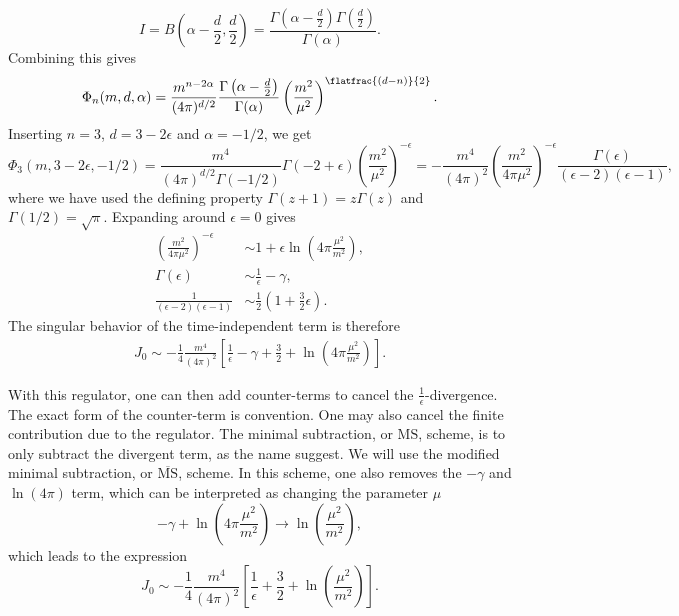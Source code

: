 \documentclass{article}
\begin{document}
\begin{equation}
    I = B\left(\alpha - \frac{d}{2}, \frac{d}{2}\right) 
    = \frac{\Gamma\left(\alpha - \frac{d}{2}\right) \Gamma\left(\frac{d}{2}\right)}{\Gamma(\alpha)}.
\end{equation}
Combining this gives
\begin{equation}
    \label{result dimreg}
    \Phi_n(m, d, \alpha) = \frac{m^{n - 2\alpha}}{(4 \pi)^{d / 2}}
    \frac{
        \Gamma \left(\alpha - \frac{d}{2} \right) 
    }
    {\Gamma(\alpha)}
    \left(\frac{m^2}{\mu^2}\right)^{\flatfrac{(d-n)}{2}} 
    .
\end{equation}
Inserting $n=3$, $d = 3 - 2\epsilon$ and $\alpha = -1/2$, we get
\begin{equation}
    \Phi_3(m, 3 - 2\epsilon, -1/2)
    =
    \frac{m^4}{(4 \pi)^{d/2}\Gamma(-1/2)} \Gamma(-2 + \epsilon) \left(\frac{m^2}{\mu^2}\right)^{-\epsilon}
    =
    - \frac{m^4}{(4 \pi)^{2}}
    \left(\frac{m^2}{4 \pi \mu^2}\right)^{- \epsilon}
    \frac{\Gamma(\epsilon)}{(\epsilon - 2)(\epsilon - 1)},
\end{equation}
where we have used the defining property $\Gamma(z + 1) = z\Gamma(z)$ and $\Gamma(1/2) = \sqrt \pi$.
Expanding around $\epsilon = 0$ gives
\begin{align}
    \left(\frac{m^2}{4 \pi \mu^2}\right)^{- \epsilon}
    &\sim 1 + \epsilon \ln\left(4 \pi \frac{\mu^2}{m^2}\right),\\
    \Gamma(\epsilon) 
    & \sim \frac{1}{\epsilon} - \gamma, \\
    \frac{1}{(\epsilon - 2)(\epsilon - 1)}
    &\sim \frac{1}{2}\left(1 + \frac{3}{2} \epsilon\right).
\end{align}
The singular behavior of the time-independent term is therefore
\begin{align}
    J_0 \sim
    - \frac{1}{4}\frac{m^4}{(4 \pi)^2}
    \left[
        \frac{1}{\epsilon} 
        - \gamma + \frac{3}{2}
        + \ln\left(4 \pi \frac{\mu^2}{m^2}\right)
    \right].
\end{align}

With this regulator, one can then add counter-terms to cancel the $\frac{1}{\epsilon}$-divergence.
The exact form of the counter-term is convention.
One may also cancel the finite contribution due to the regulator.
The minimal subtraction, or $\mathrm{MS}$, scheme, is to only subtract the divergent term, as the name suggest.
We will use the modified minimal subtraction, or $\overline{ \mathrm{MS}}$, scheme.
In this scheme, one also removes the $-\gamma$ and $\ln(4 \pi)$ term,
which can be interpreted as changing the parameter $\mu$
\begin{equation}
    -\gamma + \ln(4\pi \frac{\mu^2}{m^2}) \rightarrow \ln(\frac{\mu^2}{m^2}),
\end{equation}
which leads to the expression
\begin{equation}
    \label{free field regularized energy}
    J_0 \sim
    - \frac{1}{4}\frac{m^4}{(4 \pi)^2}
    \left[
        \frac{1}{\epsilon} 
        + \frac{3}{2}
        + \ln\left(\frac{\mu^2}{m^2}\right)
    \right].
\end{equation}
\end{document}
